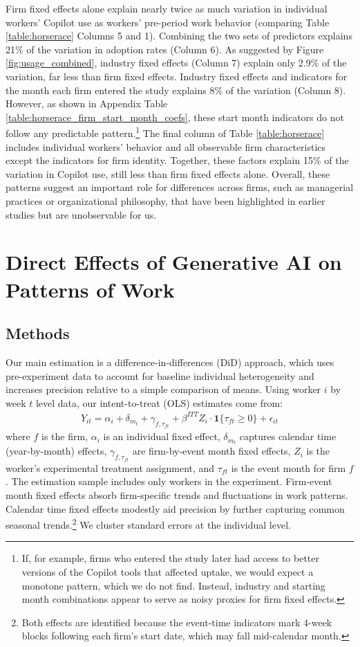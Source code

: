 \documentclass{article}
\begin{document}
Firm fixed effects alone explain nearly twice as much variation in individual workers' Copilot use as workers' pre-period work behavior (comparing Table \ref{table:horserace} Columns 5 and 1). Combining the two sets of predictors explains 21\% of the variation in adoption rates (Column 6). As suggested by Figure \ref{fig:usage_combined}, industry fixed effects (Column 7) explain only 2.9\% of the variation, far less than firm fixed effects. Industry fixed effects and indicators for the month each firm entered the study explains 8\% of the variation (Column 8). However, as shown in Appendix Table \ref{table:horserace_firm_start_month_coefs}, these start month indicators do not follow any predictable pattern.\footnote{If, for example, firms who entered the study later had access to better versions of the Copilot tools that affected uptake, we would expect a monotone pattern, which we do not find. Instead, industry and starting month combinations appear to serve as noisy proxies for firm fixed effects.} The final column of Table \ref{table:horserace} includes individual workers' behavior and all observable firm characteristics except the indicators for firm identity. Together, these factors explain 15\% of the variation in Copilot use, still less than firm fixed effects alone. Overall, these patterns suggest an important role for differences across firms, such as managerial practices or organizational philosophy, that have been highlighted in earlier studies but are unobservable for us.

\section{Direct Effects of Generative AI on Patterns of Work}
\subsection{Methods}
\label{sec:Expdesign2} 

Our main estimation is a difference-in-differences (DiD) approach, which uses pre-experiment data to account for baseline individual heterogeneity and increases precision relative to a simple comparison of means. Using worker $i$ by week $t$ level data, our intent-to-treat (OLS) estimates come from:
\begin{align}
    Y_{it} = \alpha_i + \delta_{m_t} + \gamma_{f,\tau_{ft}} + \beta^{ITT} Z_{i}\cdot\mathbf{1}\{\tau_{ft}\geq0\} + \epsilon_{it} \label{regression}
\end{align}
\noindent
where $f$ is the firm, $\alpha_i$ is an individual fixed effect, $\delta_{m_t}$ captures calendar time (year-by-month) effects, $\gamma_{f,\tau_{ft}}$ are firm-by-event month fixed effects, $Z_{i}$ is the worker's experimental treatment assignment, and $\tau_{ft}$ is the event month for firm $f$. The estimation sample includes only workers in the experiment. Firm-event month fixed effects absorb firm-specific trends and fluctuations in work patterns. Calendar time fixed effects modestly aid precision by further capturing common seasonal trends.\footnote{Both effects are identified because the event-time indicators mark 4-week blocks following each firm's start date, which may fall mid-calendar month.} We cluster standard errors at the individual level.
 
\end{document}
